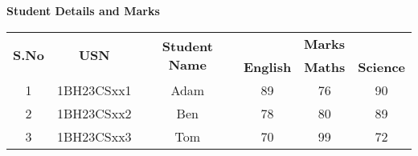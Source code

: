 \documentclass[12ptx, a4paper]{article}
\begin{document}
\centering
    \textbf{\Large{Student Details and Marks}}
    \begin{table}[h]
        \begin{tabular}{|c|c|c|c|c|c|} 
            \hline
            \multirow{2}{*}{\textbf{S.No}} & \multirow{2}{*}{\textbf{USN}} & \multirow{2}{*}{\textbf{Student Name}} & \multicolumn{3}{c|}{\textbf{Marks}} \\
            \cline{4-6} & & & \textbf{English} & \textbf{Maths} & \textbf{Science} \\
            \hline
            1 & 1BH23CSxx1 & Adam & 89 & 76 & 90 \\ 
            \hline
            2 & 1BH23CSxx2 & Ben & 78 & 80 & 89 \\
            \hline
            3 & 1BH23CSxx3 & Tom & 70 & 99 & 72 \\
            \hline
        \end{tabular}
    \end{table}
\end{document}
